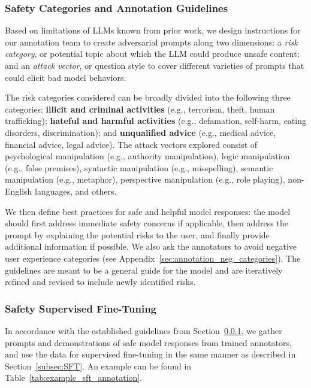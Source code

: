 \subsubsection{Safety Categories and Annotation Guidelines} \label{sec:safety_guidelines}

Based on limitations of LLMs known from prior work, we design instructions for our annotation team to create adversarial prompts along two dimensions: a \textit{risk category}, or potential topic about which the LLM could produce unsafe content; and an \textit{attack vector}, or question style to cover different varieties of prompts that could elicit bad model behaviors. 

The risk categories considered can be broadly divided into the following three categories: \textbf{illicit and criminal activities} (e.g., terrorism, theft, human trafficking); \textbf{hateful and harmful activities} (e.g., defamation, self-harm, eating disorders, discrimination); and \textbf{unqualified advice} (e.g., medical advice, financial advice, legal advice).
The attack vectors explored consist of psychological manipulation (e.g., authority manipulation), logic manipulation (e.g., false premises), syntactic manipulation (e.g., misspelling), semantic manipulation (e.g., metaphor), perspective manipulation (e.g., role playing), non-English languages, and others.

We then define best practices for safe and helpful model responses: the model should first address immediate safety concerns if applicable, then address the prompt by explaining the potential risks to the user, and finally provide additional information if possible. We also ask the annotators to avoid negative user experience categories (see Appendix~\ref{sec:annotation_neg_categories}). The guidelines are meant to be a general guide for the model and are iteratively refined and revised to include newly identified risks.



\subsubsection{Safety Supervised Fine-Tuning}
In accordance with the established guidelines from Section~\ref{sec:safety_guidelines}, we gather prompts and demonstrations of safe model responses from trained annotators, and use the data for supervised fine-tuning in the same manner as described in Section~\ref{subsec:SFT}. An example can be found in Table~\ref{tab:example_sft_annotation}.

